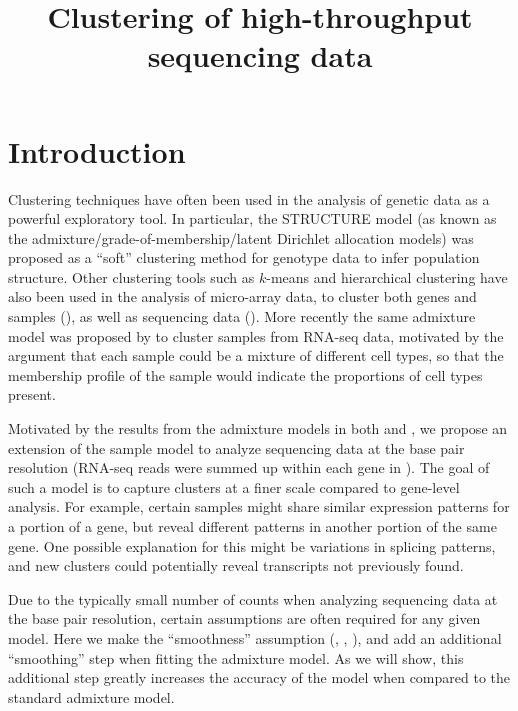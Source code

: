 \documentclass[11pt]{article}
\begin{document}
\title{\textbf{Clustering of high-throughput sequencing data}}
\date{}
\maketitle


\section{Introduction}
Clustering techniques have often been used in the analysis of genetic data as a powerful exploratory tool. In particular, the STRUCTURE model \cite{pritchard.stephens.donnelly} (as known as the admixture/grade-of-membership/latent Dirichlet allocation models) was proposed as a ``soft'' clustering method for genotype data to infer population structure. Other clustering tools such as $k$-means and hierarchical clustering have also been used in the analysis of micro-array data, to cluster both genes and samples (\cite{}), as well as sequencing data (\cite{}). More recently the same admixture model was proposed by \cite{kushal.hsiao.stephens} to cluster samples from RNA-seq data, motivated by the argument that each sample could be a mixture of different cell types, so that the membership profile of the sample would indicate the proportions of cell types present.

Motivated by the results from the admixture models in both \cite{pritchard.stephens.donnelly} and \cite{kushal.hsiao.stephens}, we propose an extension of the sample model to analyze sequencing data at the base pair resolution (RNA-seq reads were summed up within each gene in \cite{kushal.hsiao.stephens}). The goal of such a model is to capture clusters at a finer scale compared to gene-level analysis. For example, certain samples might share similar expression patterns for a portion of a gene, but reveal different patterns in another portion of the same gene. One possible explanation for this might be variations in splicing patterns, and new clusters could potentially reveal transcripts not previously found.

Due to the typically small number of counts when analyzing sequencing data at the base pair resolution, certain assumptions are often required for any given model. Here we make the ``smoothness'' assumption (\cite{heejung.stepehens}, \cite{heejung.xing.stephens}, \cite{xing.stephens}), and add an additional ``smoothing'' step when fitting the admixture model. As we will show, this additional step greatly increases the accuracy of the model when compared to the standard admixture model.
\end{document}
